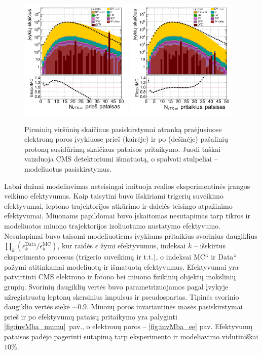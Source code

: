 \documentclass[a4paper, 12pt, oneside]{article}
\newcommand{\ltq}[1]{{\quotedblbase{}#1\textquotedblleft{}}}
\newlength\q
\begin{document}
\begin{figure}[t!]
	\includegraphics[width=0.48\textwidth]{Magistrinis/ee_nVTX_before.png}
	\includegraphics[width=0.48\textwidth]{Magistrinis/ee_nVTX_after.png}
	\vspace{-0.6cm}
	\caption{\label{fig:PUba} Pirminių viršūnių skaičiaus pasiskirstymai atranką praėjusiuose elektronų poros įvykiuose
		prieš (kairėje) ir po (dešinėje) pašalinių protonų susidūrimų skaičiaus pataisos pritaikymo.
		Juodi taškai vaizduoja CMS detektoriumi išmatuotą, o spalvoti stulpeliai -- modeliuotus pasiskirstymus.}
\end{figure}

Labai dažnai modeliavimas neteisingai imituoja realios eksperimentinės įrangos veikimo efektyvumus.
Kaip taisytini buvo išskiriami trigerių suveikimo efektyvumai, leptono trajektorijos atkūrimo ir dalelės teisingo
atpažinimo efektyvumai.
Miuonams papildomai buvo įskaitomas nesutapimas tarp tikros ir modeliuotos miuono trajektorijos izoliuotumo nustatymo efektyvumo.
Nesutapimai buvo taisomi modeliuotiems įvykiams pritaikius svorinius daugiklius $\prod_k(\epsilon_k^{\mathrm{Data}}/\epsilon_k^{\mathrm{MC}})$, 
kur raidės $\epsilon$ žymi efektyvumus, indeksai $k$ -- išskirtus eksperimento procesus (trigerio suveikimą ir t.t.),
o indeksai \ltq{MC} ir \ltq{Data} pažymi atitinkamai modeliuotą ir išmatuotą efektyvumus.
Efektyvumai yra patvirtinti CMS elektrono ir fotono bei miuono fizikinių objektų mokslinių grupių.
Svorinių daugiklių vertės buvo parametrizuojamos pagal įvykyje užregistruotų leptonų skersinius impulsus ir pseudospartas.
Tipinės svorinio daugiklio vertės siekė $\sim\!0.9$.
Miuonų poros invariantinės masės pasiskirstymai prieš ir po efektyvumų pataisų pritaikymo yra palyginti \ref{fig:invMba_mumu}~pav.,
o elektronų poros -- \ref{fig:invMba_ee} pav.
Efektyvumų pataisos padėjo pagerinti sutapimą tarp eksperimento ir modeliavimo vidutiniškai $10\%$.
\end{document}
